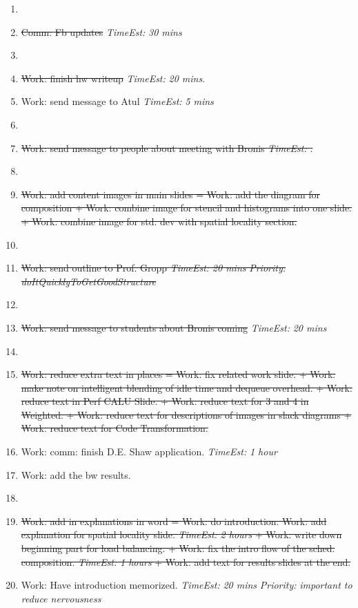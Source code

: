 \documentclass[11pt]{article}
\newcommand{\doneTask}[1]{\item \sout{\small #1}}
\newcommand{\te}[1]{\textit{TimeEst:} \textit{#1}}
\newcommand{\prio}[1]{\textit{Priority:} \textit{#1}}
\newcommand{\dl}[1]{\textit{Deadline:}#1}
\begin{document}
\begin{enumerate} 
\item \doneTask{Comm: Fb updates} \te{30 mins}

\item \doneTask{Work: finish hw writeup} \te{20 mins}.  

\item Work: send message to Atul \te{5 mins} 

\item \doneTask{Work: send message to people about meeting with Bronis \te{}. }
\item \doneTask{Work: add content images in main slides = Work: add the diagram
  for composition + Work: combine image for stencil and histograms
  into one slide.  + Work: combine image for std. dev with spatial 
  locality section.}

\item \doneTask{Work: send outline to Prof. Gropp \te{20 mins}
  \prio{doItQuicklyToGetGoodStructure}}

\item \doneTask{Work: send message to students about Bronis coming} \te{20 mins}
\item \doneTask{Work: reduce extra text in places = Work: fix related work
  slide. + Work: make note on intelligent blending of idle time and
  dequeue overhead. + Work: reduce text in Perf CALU Slide. + Work:
  reduce text for 3 and 4 in Weighted.  + Work: reduce text for
  descriptions of images in slack diagrams + Work: reduce text for
  Code Transformation.} 




\item Work: comm: finish D.E. Shaw application. \te{1 hour} 

\item Work: add the bw results.

\item \doneTask{Work: add in explanations in word = Work: do introduction. 
Work: add explanation for spatial locality slide. \te{2 hours}  +
Work: write down beginning part for load balancing. + Work: fix the
intro flow of the sched. composition. \te{1 hours}  + Work: add text
for results slides at the end. }

\item Work: Have introduction memorized. \te{20 mins} \prio {important
  to reduce nervousness} 


\end{enumerate}
\end{document}
